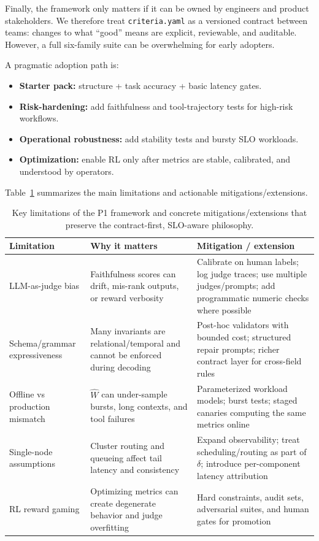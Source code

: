 \documentclass[11pt]{article}
\begin{document}
Finally, the framework only matters if it can be owned by engineers and product stakeholders.
We therefore treat \texttt{criteria.yaml} as a versioned contract between teams: changes to what ``good'' means are explicit, reviewable, and auditable.
However, a full six-family suite can be overwhelming for early adopters.

A pragmatic adoption path is:
\begin{itemize}[leftmargin=12pt]
    \item \textbf{Starter pack:} structure + task accuracy + basic latency gates.
    \item \textbf{Risk-hardening:} add faithfulness and tool-trajectory tests for high-risk workflows.
    \item \textbf{Operational robustness:} add stability tests and bursty SLO workloads.
    \item \textbf{Optimization:} enable RL only after metrics are stable, calibrated, and understood by operators.
\end{itemize}

Table~\ref{tab:limitations} summarizes the main limitations and actionable mitigations/extensions.

\begin{table}[t]
\centering
\small
\begin{tabular}{p{3.2cm}p{5.0cm}p{6.8cm}}
\toprule
\textbf{Limitation} & \textbf{Why it matters} & \textbf{Mitigation / extension} \\
\midrule
LLM-as-judge bias & Faithfulness scores can drift, mis-rank outputs, or reward verbosity & Calibrate on human labels; log judge traces; use multiple judges/prompts; add programmatic numeric checks where possible \\
\addlinespace
Schema/grammar expressiveness & Many invariants are relational/temporal and cannot be enforced during decoding & Post-hoc validators with bounded cost; structured repair prompts; richer contract layer for cross-field rules \\
\addlinespace
Offline vs production mismatch & $\widehat{W}$ can under-sample bursts, long contexts, and tool failures & Parameterized workload models; burst tests; staged canaries computing the same metrics online \\
\addlinespace
Single-node assumptions & Cluster routing and queueing affect tail latency and consistency & Expand observability; treat scheduling/routing as part of $\delta$; introduce per-component latency attribution \\
\addlinespace
RL reward gaming & Optimizing metrics can create degenerate behavior and judge overfitting & Hard constraints, audit sets, adversarial suites, and human gates for promotion \\
\bottomrule
\end{tabular}
\caption{Key limitations of the P1 framework and concrete mitigations/extensions that preserve the contract-first, SLO-aware philosophy.}
\label{tab:limitations}
\end{table}
\end{document}
